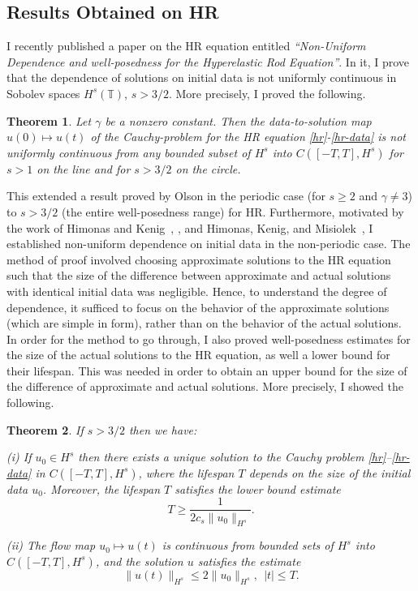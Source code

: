 \documentclass[12pt,reqno]{amsart}
\newcommand{\ci}{\mathbb{T}}
\newtheorem{theorem}{Theorem}
\begin{document}
\subsection{Results Obtained on HR} 
\label{ssec:weak-disp}
%
%
%
%
%
%
%
%
%
%
I recently published a paper on the HR equation entitled 
{\it ``Non-Uniform Dependence  and well-posedness
for the
Hyperelastic Rod Equation''}. In it, I prove
that 
the dependence of solutions on initial data is not uniformly 
continuous in Sobolev spaces $H^s(\ci)$, $s>3/2$.
More precisely, I proved the following.
\begin{theorem}
\label{hr-non-unif-dependence}
Let $\gamma$ be a nonzero constant. Then 
the data-to-solution map $u(0) \mapsto u(t)$ of the Cauchy-problem
for the HR equation
\eqref{hr}-\eqref{hr-data}
is not uniformly continuous
from any bounded subset of  $H^s$ into $C([-T, T], H^s)$
for $s>1$ on the line  and for $s>3/2$ on the circle.
%
\end{theorem}
This extended a result proved by Olson 
\cite{Olson_2006_Non-uniform-dep} in the periodic
case (for $s\ge 2$ and $\gamma \ne 3$)  to  $s>3/2$ (the entire well-posedness
range) for HR\@. Furthermore, motivated by the work of Himonas and
Kenig~\cite{Himonas:2009fk}, \cite{Himonas:2009fk}, and 
Himonas, Kenig, and Misiolek~\cite{Himonas_2009_Non-uniform-dep-per},
I established non-uniform dependence on initial data in the non-periodic case.
The method of proof involved choosing approximate solutions to the HR equation
such that the size of the difference between approximate and actual solutions
with identical initial data was negligible. Hence, to understand the degree of
dependence, it sufficed to focus on the behavior of the approximate solutions
(which are simple in form), rather than on the behavior of the actual solutions.
In order for the method to go through, I also proved well-posedness estimates
for the size of the actual solutions to the HR equation, as well a lower bound
for their lifespan. This was needed in order to obtain an upper bound for the
size of the difference of approximate and actual solutions. More precisely, I
showed the following.
\begin{theorem}
\label{thm:HR_existence_continuous_dependence}
If   $s>3/2$  then we have:

(i) If $u_0\in H^s$  then  there exists a unique solution to
the Cauchy problem  \eqref{hr}--\eqref{hr-data} in $C([-T, T], H^s)$, where 
the lifespan  $T$ depends on the size
of the initial data $u_0$. Moreover, 
the  lifespan $T$ satisfies the lower bound estimate 
%
%
%
\begin{equation}
\label{Life-span-est}
T
\ge
\frac{1}{2c_s \|u_0\|_{H^s}}.
\end{equation}
%

(ii)
The flow map $u_0 \mapsto u(t)$ is continuous from
bounded sets of $H^s$ into \\ $C([-T, T], H^s)$,
and the solution $u$ satisfies the estimate
%
%
%
\begin{equation}
\label{u_x-Linfty-Hs}
\|
u(t)
\|_ {H^s}
\le
2
\|
u_0
\|_{H^s}, \ \ |t|\le T.
\end{equation}
%
%
%
\end{theorem}
\end{document}
